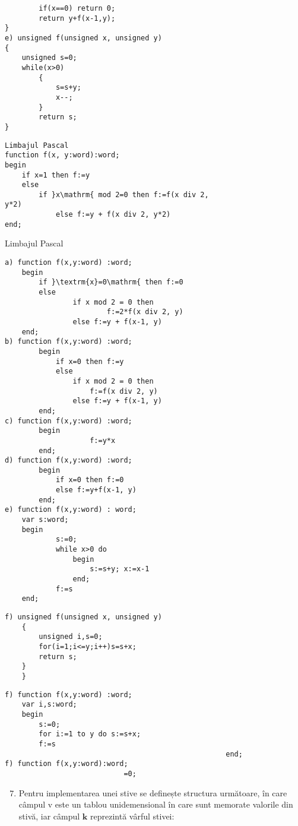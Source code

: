 \begin{verbatim}
        if(x==0) return 0;
        return y+f(x-1,y);
}
e) unsigned f(unsigned x, unsigned y)
{
    unsigned s=0;
    while(x>0)
        {
            s=s+y;
            x--;
        }
        return s;
}
\end{verbatim}

\begin{verbatim}
Limbajul Pascal
function f(x, y:word):word;
begin
    if x=1 then f:=y
    else
        if }x\mathrm{ mod 2=0 then f:=f(x div 2,
y*2)
            else f:=y + f(x div 2, y*2)
end;
\end{verbatim}

Limbajul Pascal

\begin{verbatim}
a) function f(x,y:word) :word;
    begin
        if }\textrm{x}=0\mathrm{ then f:=0
        else
                if x mod 2 = 0 then
                        f:=2*f(x div 2, y)
                else f:=y + f(x-1, y)
    end;
b) function f(x,y:word) :word;
        begin
            if x=0 then f:=y
            else
                if x mod 2 = 0 then
                    f:=f(x div 2, y)
                else f:=y + f(x-1, y)
        end;
c) function f(x,y:word) :word;
        begin
                    f:=y*x
        end;
d) function f(x,y:word) :word;
        begin
            if x=0 then f:=0
            else f:=y+f(x-1, y)
        end;
e) function f(x,y:word) : word;
    var s:word;
    begin
            s:=0;
            while x>0 do
                begin
                    s:=s+y; x:=x-1
                end;
            f:=s
    end;
\end{verbatim}

\begin{verbatim}
f) unsigned f(unsigned x, unsigned y)
    {
        unsigned i,s=0;
        for(i=1;i<=y;i++)s=s+x;
        return s;
    }
    }
\end{verbatim}

\begin{verbatim}
f) function f(x,y:word) :word;
    var i,s:word;
    begin
        s:=0;
        for i:=1 to y do s:=s+x;
        f:=s
                                                    end;
f) function f(x,y:word):word;
                            =0;
\end{verbatim}

\begin{enumerate}
  \setcounter{enumi}{6}
  \item Pentru implementarea unei stive se definește structura următoare, în care câmpul v este un tablou unidemensional în care sunt memorate valorile din stivă, iar câmpul $\mathbf{k}$ reprezintă vârful stivei:
\end{enumerate}


